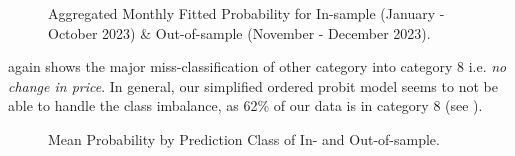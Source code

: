 \begin{figure}[H]
    \centering
    \caption{Aggregated Monthly Fitted Probability for In-sample (January - October 2023) \& Out-of-sample (November - December 2023).}
    \label{fig:figure-4}
\end{figure}

 again shows the major miss-classification of other category into category 8 i.e. \textit{no change in price}. In general, our simplified ordered probit model seems to not be able to handle the class imbalance, as 62\% of our data is in category 8 (see ).

\begin{figure}[H]
    \centering
    \caption{Mean Probability by Prediction Class of In- and Out-of-sample.}
    \label{fig:figure-5}
\end{figure}